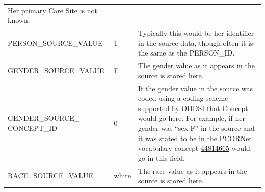 \documentclass[11pt]{book}
\theoremstyle{definition}
\theoremstyle{definition}
\theoremstyle{definition}
\theoremstyle{remark}
\begin{document}
\begin{longtable}[]{@{}lll@{}}
\begin{minipage}[t]{0.49\columnwidth}
Her primary Care Site is not known.\strut
\end{minipage}\tabularnewline
\begin{minipage}[t]{0.28\columnwidth}\raggedright
PERSON\_SOURCE\_VALUE\strut
\end{minipage} & \begin{minipage}[t]{0.15\columnwidth}\raggedright
1\strut
\end{minipage} & \begin{minipage}[t]{0.49\columnwidth}\raggedright
Typically this would be her identifier in the source data, though often it is the same as the PERSON\_ID.\strut
\end{minipage}\tabularnewline
\begin{minipage}[t]{0.28\columnwidth}\raggedright
GENDER\_SOURCE\_VALUE\strut
\end{minipage} & \begin{minipage}[t]{0.15\columnwidth}\raggedright
F\strut
\end{minipage} & \begin{minipage}[t]{0.49\columnwidth}\raggedright
The gender value as it appears in the source is stored here.\strut
\end{minipage}\tabularnewline
\begin{minipage}[t]{0.28\columnwidth}\raggedright
GENDER\_SOURCE\_ CONCEPT\_ID\strut
\end{minipage} & \begin{minipage}[t]{0.15\columnwidth}\raggedright
0\strut
\end{minipage} & \begin{minipage}[t]{0.49\columnwidth}\raggedright
If the gender value in the source was coded using a coding scheme supported by OHDSI that Concept would go here. For example, if her gender was ``sex-F'' in the source and it was stated to be in the PCORNet vocabulary concept \href{http://athena.ohdsi.org/search-terms/terms/44814665}{44814665} would go in this field.\strut
\end{minipage}\tabularnewline
\begin{minipage}[t]{0.28\columnwidth}\raggedright
RACE\_SOURCE\_VALUE\strut
\end{minipage} & \begin{minipage}[t]{0.15\columnwidth}\raggedright
white\strut
\end{minipage} & \begin{minipage}[t]{0.49\columnwidth}\raggedright
The race value as it appears in the source is stored here.\strut
\end{minipage}\tabularnewline

\end{longtable}
\end{document}
